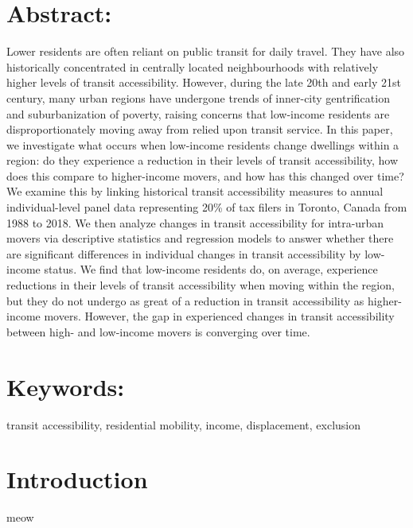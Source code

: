 \section*{{Abstract:}}


	Lower residents are often reliant on public transit for daily travel. They have also historically concentrated in centrally located neighbourhoods with relatively higher levels of transit accessibility. However, during the late 20th and early 21st century, many urban regions have undergone trends of inner-city gentrification and suburbanization of poverty, raising concerns that low-income residents are disproportionately moving away from relied upon transit service. In this paper, we investigate what occurs when low-income residents change dwellings within a region: do they experience a reduction in their levels of transit accessibility, how does this compare to higher-income movers, and how has this changed over time? We examine this by linking historical transit accessibility measures to annual individual-level panel data representing 20\% of tax filers in Toronto, Canada from 1988 to 2018. We then analyze changes in transit accessibility for intra-urban movers via descriptive statistics and regression models to answer whether there are significant differences in individual changes in transit accessibility by low-income status. We find that low-income residents do, on average, experience reductions in their levels of transit accessibility when moving within the region, but they do not undergo as great of a reduction in transit accessibility as higher-income movers. However, the gap in experienced changes in transit accessibility between high- and low-income movers is converging over time.


\section*{{Keywords:}}

transit accessibility, residential mobility, income, displacement, exclusion



\section{Introduction}

meow